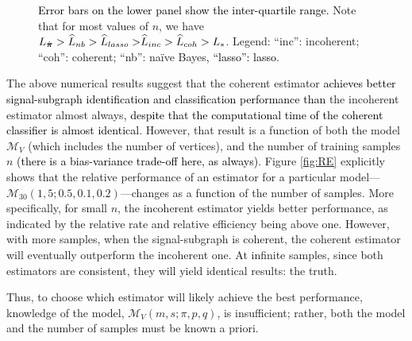 \documentclass[10pt,journal,cspaper,compsoc]{IEEEtran}
\providecommand{\tk}[1]{\textcolor{black}{#1}}
\providecommand{\mc}[1]{\mathcal{#1}}
\providecommand{\wh}[1]{\widehat{#1}}
\providecommand{\mhb}[1]{\hat{\boldsymbol{#1}}}
\newcommand{\comment}[1]{}
\begin{document}
\begin{figure}[htbp]
{	\tk{Error bars on the lower panel show the inter-quartile range.}
	Note that for most values of $n$, we have $L_{\mhb{\pi}} > \wh{L}_{nb} > \tk{\wh{L}_{lasso} >} \wh{L}_{inc} > \wh{L}_{coh} > L_*$. Legend: ``inc'': incoherent; ``coh'': coherent; ``nb'': na\"ive Bayes\tk{, ``lasso'': lasso}.}
	\label{fig:homo}
\end{figure}



The above numerical results suggest that the coherent estimator \tk{achieves better signal-subgraph identification and classification performance than} \comment{outperforms} the incoherent estimator almost always\tk{, despite that the computational time of the coherent classifier is almost identical}.  However, that result is a function of both the model $\mc{M}_V$ (which includes the number of vertices), and the number of training samples $n$ \tk{(there is a bias-variance trade-off here, as always)}.  %
Figure \ref{fig:RE} explicitly shows that the relative performance of an estimator for a particular model---$\mc{M}_{30}(1,5;0.5,0.1,0.2)$---changes as a function of the number of samples.  More specifically, for small $n$, the incoherent estimator yields better performance, as indicated by the relative rate and relative efficiency being above one.  However, with more samples, when the signal-subgraph is coherent, the coherent estimator will eventually outperform the incoherent one.  At infinite samples, since both estimators are consistent, they will yield identical results: the truth.  

Thus, to choose which estimator will likely achieve the best performance, knowledge of the model, $\mc{M}_V(m,s;\pi,p,q)$, is insufficient; rather, both the model and the number of samples must be known a priori.  
\end{document}
